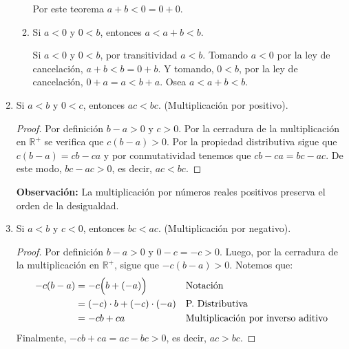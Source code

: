 \documentclass[11pt]{article}
\newcommand{\R}{\mathbb{R}}
\begin{document}
\begin{enumerate}[label=\alph*)]
\begin{enumerate}[label=\roman*)]
        Por este teorema $a+b<0=0+0$.

        \item Si $a<0$ y $0<b$, entonces $a<a+b<b$.
        
        Si $a<0$ y $0<b$, por transitividad $a<b$. Tomando $a<0$ por la ley de cancelación, $a+b<b=0+b$. Y tomando, $0<b$, por la ley de cancelación, $0+a=a<b+a$. Osea $a<a+b<b$.
    \end{enumerate}

    \item Si $a<b$ y $0<c$, entonces $ac<bc$. (Multiplicación por positivo).
    
    \vspace{-1em}\begin{proof} 
        Por definición $b-a >0$ y $c >0$. Por la cerradura de la multiplicación en $\R^+$ se verifica que $c(b-a) >0$. Por la propiedad distributiva sigue que $c(b-a)=cb-ca$ y por conmutatividad tenemos que $cb-ca=bc-ac$. De este modo, $bc-ac >0$, es decir, $ac<bc$.    
    \end{proof} \vspace{-1em}

    \textbf{Observación:} La multiplicación por números reales positivos preserva el orden de la desigualdad.

    \item Si $a<b$ y $c<0$, entonces $bc<ac$. (Multiplicación por negativo).
    
    \vspace{-1em}\begin{proof} 
    Por definición $b-a >0$ y $0 - c=-c >0$. Luego, por la cerradura de la multiplicación en $\R^+$, sigue que $-c(b-a) >0$. Notemos que:
    \begin{align*}
    -c(b-a) &= -c \Bigl( b + (-a) \Bigr) && \text{Notación}\\
    &= (-c) \cdot b + (-c) \cdot (-a) && \text{P. Distributiva}\\
    &= -cb +ca && \text{Multiplicación por inverso aditivo}
    \end{align*}
    Finalmente, $-cb +ca=ac - bc >0$, es decir, $ac>bc$.    
    \end{proof} \vspace{-1em}


\end{enumerate}
\end{document}
